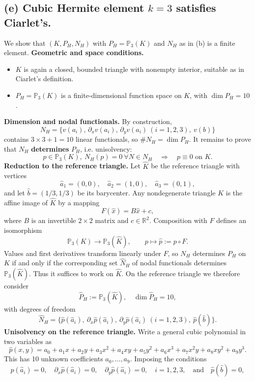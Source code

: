 \subsection*{(e) Cubic Hermite element $k = 3$ satisfies Ciarlet's.}
We show that $(K,P_H,N_H)$ with $P_H=\mathbb{P}_3(K)$ and $N_H$ as in (b) is a finite element.
\textbf{Geometric and space conditions.}
\begin{itemize}
    \item $K$ is again a closed, bounded triangle with nonempty interior, suitable as in Ciarlet's definition.
    \item $P_H = \mathbb{P}_3(K)$ is a finite-dimensional function space on $K$, with
          $\dim P_H = 10$.
\end{itemize}
\textbf{Dimension and nodal functionals.}
By construction,
\[
    N_H = \{v(a_i),\,\partial_x v(a_i),\,\partial_y v(a_i)\ (i=1,2,3),\ v(b)\}
\]
contains $3\times 3 + 1 = 10$ linear functionals, so $\#N_H = \dim P_H$.
It remains to prove that $N_H$ \textbf{determines} $P_H$, i.e. unisolvency:
\[
    p \in \mathbb{P}_3(K),\ N_H(p) = 0 \ \forall N \in N_H
    \quad \Longrightarrow \quad p \equiv 0 \text{ on } K.
\]
\textbf{Reduction to the reference triangle.}
Let $\widehat K$ be the reference triangle with vertices
\[
    \hat a_1 = (0,0),\quad \hat a_2 = (1,0),\quad \hat a_3 = (0,1),
\]
and let $\hat b = (1/3,1/3)$ be its barycenter.
Any nondegenerate triangle $K$ is the affine image of $\widehat K$ by a mapping
\[
    F(\hat x) = B \hat x + c,
\]
where $B$ is an invertible $2\times 2$ matrix and $c\in\mathbb{R}^2$.
Composition with $F$ defines an isomorphism
\[
    \mathbb{P}_3(K) \to \mathbb{P}_3(\widehat K),\qquad
    p \mapsto \hat p := p\circ F.
\]
Values and first derivatives transform linearly under $F$, so
$N_H$ determines $P_H$ on $K$ if and only if the corresponding set
$\widehat N_H$ of nodal functionals determines $\mathbb{P}_3(\widehat K)$.
Thus it suffices to work on $\widehat K$.
On the reference triangle we therefore consider
\[
    \widehat P_H := \mathbb{P}_3(\widehat K),
    \quad \dim \widehat P_H = 10,
\]
with degrees of freedom
\[
    \widehat N_H =
    \{\hat p(\hat a_i),\ \partial_x \hat p(\hat a_i),\ \partial_y \hat p(\hat a_i)\ (i=1,2,3),\
    \hat p(\hat b)\}.
\]
\textbf{Unisolvency on the reference triangle.}
Write a general cubic polynomial in two variables as
\[
    \hat p(x,y) = a_0
    + a_1 x + a_2 y
    + a_3 x^2 + a_4 xy + a_5 y^2
    + a_6 x^3 + a_7 x^2 y + a_8 xy^2 + a_9 y^3.
\]
This has 10 unknown coefficients $a_0,\dots,a_9$.
Imposing the conditions
\[
    \hat p(\hat a_i) = 0,\quad
    \partial_x \hat p(\hat a_i) = 0,\quad
    \partial_y \hat p(\hat a_i) = 0,\quad i=1,2,3,
    \quad \text{and}\quad \hat p(\hat b) = 0,
\]
